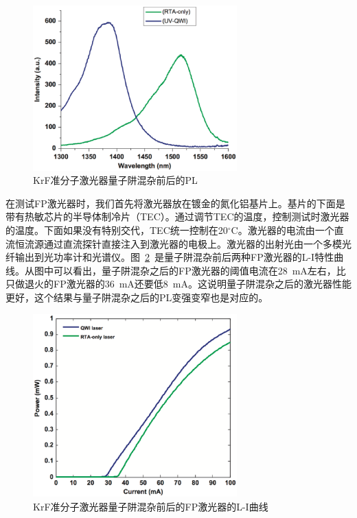 \documentclass{ZJUthesis}
\begin{document}
\begin{figure}[htbp]
    \centering
    \includegraphics[width=0.7\textwidth]{./Pictures/fp_shift.eps}
    \caption{KrF准分子激光器量子阱混杂前后的PL}
    \label{fig_fp_shift}
\end{figure}

在测试FP激光器时，我们首先将激光器放在镀金的氮化铝基片上。基片的下面是带有热敏芯片的半导体制冷片（TEC）。通过调节TEC的温度，控制测试时激光器的温度。下面如果没有特别交代，TEC统一控制在20$^{\circ}$C。激光器的电流由一个直流恒流源通过直流探针直接注入到激光器的电极上。激光器的出射光由一个多模光纤输出到光功率计和光谱仪。图~\ref{fig_fp_li}~是量子阱混杂前后两种FP激光器的L-I特性曲线。从图中可以看出，量子阱混杂之后的FP激光器的阈值电流在28~mA左右，比只做退火的FP激光器的36~mA还要低8~mA。这说明量子阱混杂之后的激光器性能更好，这个结果与量子阱混杂之后的PL变强变窄也是对应的。

\begin{figure}[htbp]
    \centering
    \includegraphics[width=0.7\textwidth]{./Pictures/fp_li.eps}
    \caption{KrF准分子激光器量子阱混杂前后的FP激光器的L-I曲线}
    \label{fig_fp_li}
\end{figure}
\end{document}
